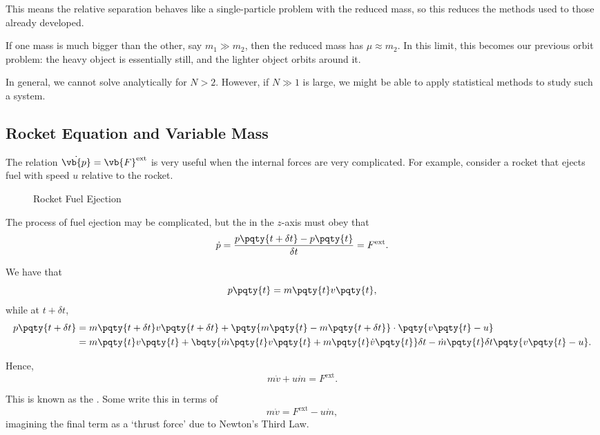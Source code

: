 This means the relative separation behaves like a single-particle problem with the reduced mass, so this reduces the methods used to those already developed.

If one mass is much bigger than the other, say \(m_1 \gg m_2\), then the reduced mass has \(\mu \approx m_2\). In this limit, this becomes our previous orbit problem: the heavy object is essentially still, and the lighter object orbits around it.

In general, we cannot solve analytically for \(N > 2\). However, if \(N \gg 1\) is large, we might be able to apply statistical methods to study such a system.

\subsection{Rocket Equation and Variable Mass}

The relation \(\dot{\vb{p}} = \vb{F}^{\text{ext}}\) is very useful when the internal forces are very complicated. For example, consider a rocket that ejects fuel with speed \(u\) relative to the rocket.

\begin{figure}[ht!]
    \centering

    \caption{Rocket Fuel Ejection}
    \label{fig:rocket}%
\end{figure}

The process of fuel ejection may be complicated, but the  in the \(z\)-axis must obey that
\begin{equation}
    \dot{p} = \frac{p \pqty{t + \delta t} - p \pqty{t}}{\delta t} = F^{\text{ext}}.
\end{equation}

We have that
\begin{equation}
    p\pqty{t} = m\pqty{t} v\pqty{t},
\end{equation}
while at \(t + \delta t\),
\begin{subequations}\begin{align}
    p\pqty{t + \delta t} &= m \pqty{t + \delta t} v \pqty{t + \delta t} + \pqty{m\pqty{t} - m\pqty{t + \delta t}} \cdot \pqty{v\pqty{t} - u} \\
    &= m\pqty{t} v\pqty{t} + \bqty{\dot{m}\pqty{t} v\pqty{t} + m\pqty{t} \dot{v}\pqty{t}} \delta t - \dot{m} \pqty{t} \delta t \pqty{v\pqty{t} - u}.
\end{align}\end{subequations}

Hence,
\begin{equation}
    \boxed{m \dot{v} + u \dot{m} = F^{\text{ext}}.}
\end{equation}

This is known as the . Some write this in terms of
\begin{equation}
    m \dot{v} = F^{\text{ext}} - u \dot{m},
\end{equation}
imagining the final term as a `thrust force' due to Newton's Third Law.